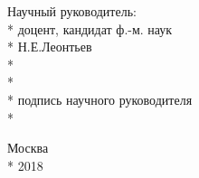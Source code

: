 \documentclass[a4paper,14pt]{article}
\begin{document}
\begin{titlepage}
\begin{flushright}
\begin{minipage}{10cm}
Научный руководитель: \\*
доцент, кандидат ф.-м. наук \\*
Н.Е.Леонтьев \\*
\vspace{1cm} \\*
\underline{\hspace{2in}} \\*
подпись научного руководителя \\*
\end{minipage}
\end{flushright}

\vspace{1.5cm}

\begin{center}
Москва \\*
\vspace{0.5cm}
2018
\end{center}

\end{titlepage}
\end{document}
